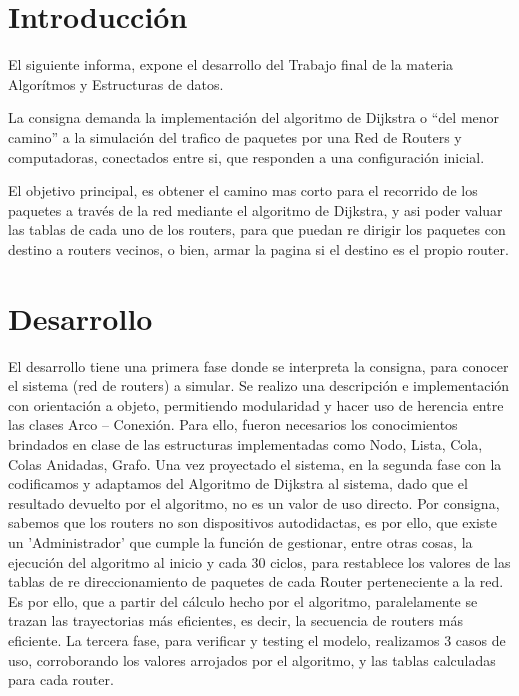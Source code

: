 \documentclass[12pt]{article} %
\begin{document}

\tableofcontents %

\newpage %


\section{Introducción} %

El siguiente informa, expone el desarrollo del Trabajo final de la materia Algorítmos y Estructuras de datos.

La consigna demanda la implementación  del algoritmo de Dijkstra  o  “del menor camino” a la simulación del trafico de  paquetes por una Red de Routers y computadoras, conectados entre si, que responden a una configuración inicial.

El objetivo principal, es obtener  el camino mas corto para el recorrido de los paquetes a través de la red mediante el algoritmo de Dijkstra, y asi poder valuar las tablas de cada uno de los routers, para que puedan re dirigir los paquetes con destino a routers vecinos, o bien, armar la pagina si el destino es el propio router.


\section{Desarrollo} %
El desarrollo tiene una primera fase donde se interpreta la consigna, para conocer el sistema (red de routers) a simular. Se realizo una descripción e implementación con orientación a objeto, permitiendo modularidad y hacer uso de herencia entre las clases Arco – Conexión.
Para ello, fueron necesarios los conocimientos brindados en clase de las estructuras implementadas como Nodo, Lista, Cola, Colas Anidadas, Grafo.
Una vez proyectado el sistema, en la segunda fase con la codificamos y adaptamos del  Algoritmo de Dijkstra al sistema, dado que el resultado devuelto por el algoritmo, no es un valor de uso directo. 
Por consigna, sabemos que los routers no son dispositivos autodidactas, es por ello, que existe un  ’Administrador’ que  cumple la función de gestionar, entre otras cosas,  la ejecución del algoritmo al inicio y cada 30 ciclos, para restablece los valores de las tablas de re direccionamiento de paquetes de cada Router perteneciente a la red. Es por ello, que a  partir del cálculo hecho por  el algoritmo, paralelamente se trazan las trayectorias más eficientes, es decir, la  secuencia de routers más eficiente.
La tercera fase, para verificar y testing el modelo, realizamos 3 casos de uso, corroborando los valores arrojados por el algoritmo, y las tablas calculadas para cada router.
\end{document}

